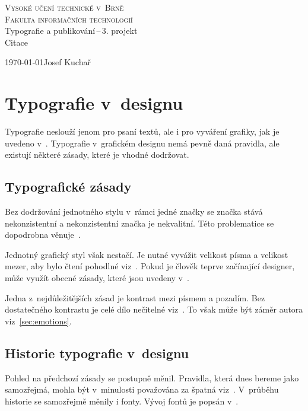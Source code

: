 \documentclass{article}
\begin{document}
\begin{titlepage}
    \begin{center}
        \Huge \textsc{Vysoké učení technické v~Brně} \\
        \huge \textsc{Fakulta informačních technologií} \\
        \LARGE{Typografie a publikování\,--\,3. projekt} \\
        \Huge {Citace}
    \end{center}
    {\Large \today \hfill Josef Kuchař}
    \bigskip
\end{titlepage}

\section{Typografie v~designu}

Typografie neslouží jenom pro psaní textů, ale i pro vyváření grafiky, jak je uvedeno v~\cite{webpage:designhill}.
Typografie v~grafickém designu nemá pevně daná pravidla, ale existují některé zásady, které je vhodné dodržovat.

\subsection{Typografické zásady}
Bez dodržování jednotného stylu v~rámci jedné značky se značka stává nekonzistentní a nekonzistentní značka je nekvalitní.
Této problematice se dopodrobna věnuje~\cite{thesis:capouchova}.

Jednotný grafický styl však nestačí. Je nutné vyvážit velikost písma a velikost mezer, aby bylo čtení pohodlné viz~\cite{webpage:creativebloq}.
Pokud je člověk teprve začínající designer, může využít obecné zásady, které jsou uvedeny v~\cite{webpage:peckadesign}.

Jedna z~nejdůležitějších zásad je kontrast mezi písmem a pozadím. Bez dostatečného kontrastu je celé dílo nečitelné viz~\cite{book:elam}.
To však může být záměr autora viz~\ref{sec:emotions}.

\subsection{Historie typografie v~designu}
Pohled na předchozí zásady se postupně měnil. Pravidla, která dnes bereme jako samozřejmá, mohla být v~minulosti považována za špatná viz~\cite{book:bringhurst}.
V~průběhu historie se samozřejmě měnily i fonty. Vývoj fontů je popsán v~\cite{article:behrens}.
\end{document}
